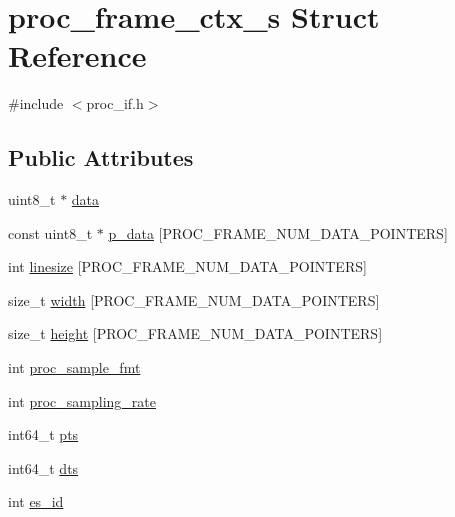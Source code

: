 \hypertarget{structproc__frame__ctx__s}{}\section{proc\+\_\+frame\+\_\+ctx\+\_\+s Struct Reference}
\label{structproc__frame__ctx__s}


{\ttfamily \#include $<$proc\+\_\+if.\+h$>$}

\subsection*{Public Attributes}
\begin{DoxyCompactItemize}
\item 
uint8\+\_\+t $\ast$ \hyperlink{structproc__frame__ctx__s_ae3e8c9753324e6798ef8613fd3e772d2}{data}
\item 
const uint8\+\_\+t $\ast$ \hyperlink{structproc__frame__ctx__s_ac6381b5fe9fa44fc575ab35a12e19a50}{p\+\_\+data} \mbox{[}P\+R\+O\+C\+\_\+\+F\+R\+A\+M\+E\+\_\+\+N\+U\+M\+\_\+\+D\+A\+T\+A\+\_\+\+P\+O\+I\+N\+T\+E\+RS\mbox{]}
\item 
int \hyperlink{structproc__frame__ctx__s_a68abb3bc396beba4b30cd13b2bcc8eda}{linesize} \mbox{[}P\+R\+O\+C\+\_\+\+F\+R\+A\+M\+E\+\_\+\+N\+U\+M\+\_\+\+D\+A\+T\+A\+\_\+\+P\+O\+I\+N\+T\+E\+RS\mbox{]}
\item 
size\+\_\+t \hyperlink{structproc__frame__ctx__s_ae6221b8581a9b08b7fceaa08050dbeb5}{width} \mbox{[}P\+R\+O\+C\+\_\+\+F\+R\+A\+M\+E\+\_\+\+N\+U\+M\+\_\+\+D\+A\+T\+A\+\_\+\+P\+O\+I\+N\+T\+E\+RS\mbox{]}
\item 
size\+\_\+t \hyperlink{structproc__frame__ctx__s_ab3f274e1a3c0df994275d29d7fce36da}{height} \mbox{[}P\+R\+O\+C\+\_\+\+F\+R\+A\+M\+E\+\_\+\+N\+U\+M\+\_\+\+D\+A\+T\+A\+\_\+\+P\+O\+I\+N\+T\+E\+RS\mbox{]}
\item 
int \hyperlink{structproc__frame__ctx__s_aa68098f554e8a167b34d8454af44afda}{proc\+\_\+sample\+\_\+fmt}
\item 
int \hyperlink{structproc__frame__ctx__s_a6b92794eac73a513fe18d5e4847ec4ed}{proc\+\_\+sampling\+\_\+rate}
\item 
int64\+\_\+t \hyperlink{structproc__frame__ctx__s_ab08e6752be55e23d4a37ec37931a30b9}{pts}
\item 
int64\+\_\+t \hyperlink{structproc__frame__ctx__s_a7300cb89fc1872dbcad499aa4d8435dd}{dts}
\item 
int \hyperlink{structproc__frame__ctx__s_a457dcb8ae6440506054f07483f48be1f}{es\+\_\+id}
\end{DoxyCompactItemize}



